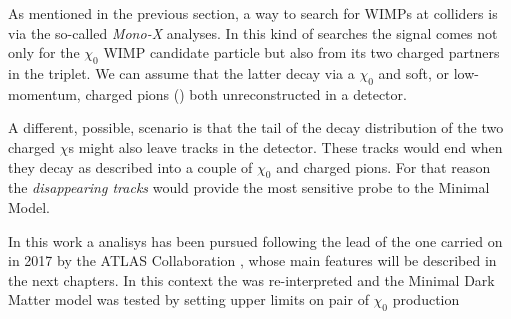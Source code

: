 As mentioned in the previous section, a way to search for WIMPs at colliders is via the so-called \emph{Mono-X} analyses. In this kind of searches the signal comes not only for the $\chi_0$ WIMP candidate particle but also from its two charged partners in the triplet. We can assume that the latter decay via a $\chi_0$ and soft, or low-momentum, charged pions (\pipm) both unreconstructed in a detector. 

A different, possible, scenario is that the tail of the decay distribution of the two charged $\chi$s might also leave tracks in the detector. These tracks would end when they decay as described into a couple of $\chi_0$ and charged pions. For that reason the \emph{disappearing tracks} would provide the most sensitive probe to the Minimal Model.

\smallskip
In this work a \mph analisys has been pursued following the lead of the one carried on in 2017 by the ATLAS Collaboration \cite{paperMP}, whose main features will be described in the next chapters. In this context the \mph was re-interpreted and the Minimal Dark Matter model was tested by setting upper limits on pair of $\chi_0$ production









